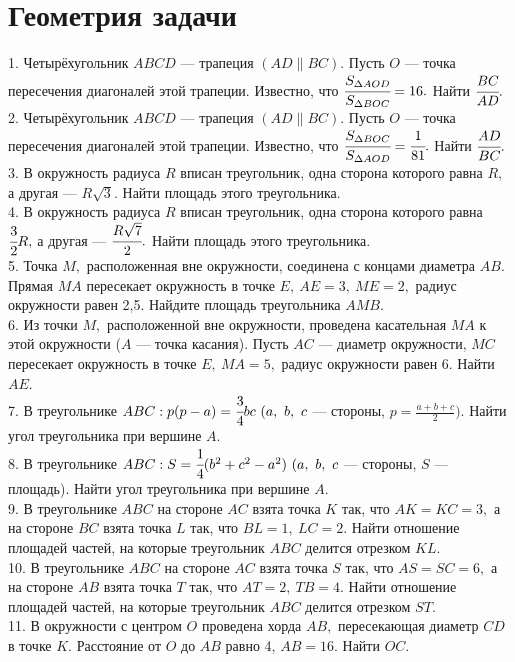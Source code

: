 \documentclass[12pt]{article}
\begin{document}
\section{Геометрия задачи}
1. Четырёхугольник $ABCD$ --- трапеция $(AD\parallel BC).$ Пусть $O$ --- точка пересечения диагоналей этой трапеции. Известно, что $\cfrac{S_{\Delta AOD}}{S_{\Delta BOC}}=16.$ Найти $\cfrac{BC}{AD}.$\\
2. Четырёхугольник $ABCD$ --- трапеция $(AD\parallel BC).$ Пусть $O$ --- точка пересечения диагоналей этой трапеции. Известно, что $\cfrac{S_{\Delta BOC}}{S_{\Delta AOD}}=\cfrac{1}{81}.$ Найти $\cfrac{AD}{BC}.$\\
3. В окружность радиуса $R$ вписан треугольник, одна сторона которого равна $R,$ а другая --- $R\sqrt{3}.$ Найти площадь этого треугольника.\\
4. В окружность радиуса $R$ вписан треугольник, одна сторона которого равна $\cfrac{3}{2}R,$ а другая --- $\cfrac{R\sqrt{7}}{2}.$ Найти площадь этого треугольника.\\
5. Точка $M,$ расположенная вне окружности, соединена с концами диаметра $AB.$ Прямая $MA$ пересекает окружность в точке $E,\ AE=3,\ ME=2,$ радиус окружности равен 2,5. Найдите площадь треугольника $AMB.$\\
6. Из точки $M,$ расположенной вне окружности, проведена касательная $MA$ к этой окружности ($A$ --- точка касания). Пусть $AC$ --- диаметр окружности, $MC$ пересекает окружность в точке $E,\ MA=5,$ радиус окружности равен 6. Найти $AE.$\\
7. В треугольнике $ABC: p(p-a)=\cfrac{3}{4}bc\ (a,\ b,\ c$ --- стороны, $p=\frac{a+b+c}{2}).$ Найти угол треугольника при вершине $A.$\\
8. В треугольнике $ABC: S=\cfrac{1}{4}(b^2+c^2-a^2)\ (a,\ b,\ c$ --- стороны, $S$ --- площадь). Найти угол треугольника при вершине $A.$\\
9. В треугольнике $ABC$ на стороне $AC$ взята точка $K$ так, что $AK=KC=3,$ а на стороне $BC$ взята точка $L$ так, что $BL=1,\ LC=2.$ Найти отношение площадей частей, на которые треугольник $ABC$ делится отрезком $KL.$\\
10. В треугольнике $ABC$ на стороне $AC$ взята точка $S$ так, что $AS=SC=6,$ а на стороне $AB$ взята точка $T$ так, что $AT=2,\ TB=4.$ Найти отношение площадей частей, на которые треугольник $ABC$ делится отрезком $ST.$\\
11. В окружности с центром $O$ проведена хорда $AB,$ пересекающая диаметр $CD$ в точке $K.$ Расстояние от  $O$ до $AB$ равно 4, $AB=16.$ Найти $OC.$\\
\end{document}
